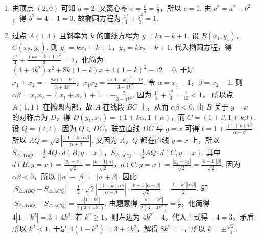 \begin{solution}
\begin{enumerate}
\item 由顶点 \( \left( 2,0 \right) \) 可知 \( a=2 \). 又离心率 \( e=\frac{c}{a}=\frac{1}{2} \)，所以 \( c=1 \). 由 \( c^2=a^2-b^2 \)，得 \( b^2=4-1=3 \).
故椭圆方程为 \( \frac{x^2}{4}+\frac{y^2}{3}=1 \).

\item 过点 \( A\left( 1,1 \right) \) 且斜率为 \( k \) 的直线方程为 \( y=kx-k+1 \).
设 \( B\left( x_1,y_1 \right) \)，\( C\left( x_2,y_2 \right) \). 则 \( y_1=kx_1-k+1 \)，\( y_2=kx_2-k+1 \).
代入椭圆方程，得 \( \frac{x^2}{4}+\frac{\left( kx-k+1 \right)^2}{3}=1 \)，化简为 \( \left( 3+4k^2 \right)x^2+8k\left( 1-k \right)x+4\left( 1-k \right)^2-12=0 \). 于是 \( x_1+x_2=-\frac{8k\left( 1-k \right)}{3+4k^2} \)，\( x_1x_2=\frac{4\left( 1-k \right)^2-12}{3+4k^2} \).
令 \( \alpha=x_1-1 \)，\( \beta=x_2-1 \).
则 \( \alpha\beta=x_1x_2-\left( x_1+x_2 \right)+1=-\frac{5}{3+4k^2} \).
因为 \( \frac{1^2}{4}+\frac{1^2}{3}=\frac{7}{12}<1 \)，
所以点 \( A\left( 1,1 \right) \) 在椭圆内部，故 \(A\) 在线段 \(BC\) 上，从而 \( \alpha\beta<0 \).
由 \(B\) 关于 \( y=x \) 的对称点为 \(D\)，得 \( D\left( y_1,x_1 \right)=\left( 1+k\alpha,1+\alpha \right) \)，而 \( C=\left( 1+\beta,1+k\beta \right) \).
设 \( Q=\left( t,t \right) \). 因为 \( Q\in DC \)，联立直线 \(DC\) 与 \( y=x \) 可得 \( t=1+\frac{\left( 1+k \right)\alpha\beta}{\alpha+\beta} \).
所以 \( AQ=\sqrt{2}\left| \frac{\left( 1+k \right)\alpha\beta}{\alpha+\beta} \right| \).
又因为 \(A\)，\(Q\) 都在直线 \( y=x \) 上，所以 \( S_{\triangle ABQ}=\frac{1}{2}AQ\cdot d\left( B,y=x \right) \)，\( S_{\triangle ACQ}=\frac{1}{2}AQ\cdot d\left( C,y=x \right) \). 其中 \( d\left( B,y=x \right)=\frac{\left| y_1-x_1 \right|}{\sqrt{2}}=\frac{\left| k-1 \right|\left| \alpha \right|}{\sqrt{2}} \)，\( d\left( C,y=x \right)=\frac{\left| y_2-x_2 \right|}{\sqrt{2}}=\frac{\left| k-1 \right|\left| \beta \right|}{\sqrt{2}} \).
因为 \( \alpha\beta<0 \)，所以 \( \left| \left| \alpha \right|-\left| \beta \right| \right|=\left| \alpha+\beta \right| \). 因此 \( \left| S_{\triangle ABQ}-S_{\triangle ACQ} \right|=\frac{1}{2}\cdot \sqrt{2}\left| \frac{\left( 1+k \right)\alpha\beta}{\alpha+\beta} \right|\cdot \frac{\left| k-1 \right|\left| \alpha+\beta \right|}{\sqrt{2}}=\frac{\left| 1-k^2 \right|\left| \alpha\beta \right|}{2} \).
即 \( \left| S_{\triangle ABQ}-S_{\triangle ACQ} \right|=\frac{5\left| 1-k^2 \right|}{2\left( 3+4k^2 \right)} \). 由题意得 \( \frac{5\left| 1-k^2 \right|}{2\left( 3+4k^2 \right)}=\frac{5}{8} \)，化简得 \( 4\left| 1-k^2 \right|=3+4k^2 \).
若 \( k^2\ge 1 \)，则左边为 \( 4k^2-4 \)，代入上式得 \( -4=3 \)，矛盾. 所以 \( k^2<1 \). 于是 \( 4\left( 1-k^2 \right)=3+4k^2 \)，解得 \( 8k^2=1 \)，所以 \( k=\pm \frac{\sqrt{2}}{4} \).
\end{enumerate}
\end{solution}

